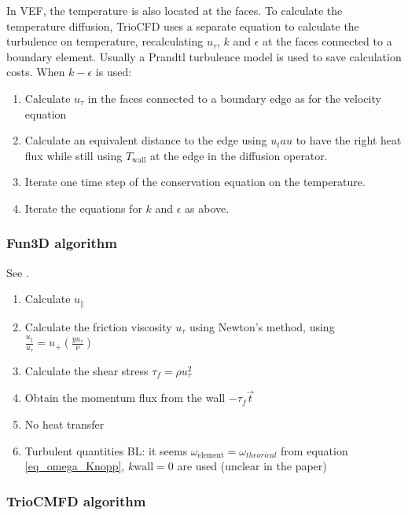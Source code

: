 In VEF, the temperature is also located at the faces. To calculate the temperature diffusion, TrioCFD uses a separate equation to calculate the turbulence on temperature, recalculating $u_\tau$, $k$ and $\epsilon$ at the faces connected to a boundary element. Usually a Prandtl turbulence model is used to save calculation costs. When $k-\epsilon$ is used:
\begin{enumerate}
	\item Calculate $u_\tau$ in the faces connected to a boundary edge as for the velocity equation
	\item Calculate an equivalent distance to the edge using $u_tau$ to have the right heat flux while still using $T_{\text{wall}}$ at the edge in the diffusion operator.
	\item Iterate one time step of the conservation equation on the temperature.
	\item Iterate the equations for $k$ and $\epsilon$ as above.
\end{enumerate} 

\subsubsection{Fun3D algorithm}

See \cite{Fun3D2015}.

\begin{enumerate}
	\item Calculate $u_\parallel$
	\item Calculate the friction viscosity $u_\tau$ using Newton's method, using $\frac{u_\parallel}{u_\tau} = u_+(\frac{y u_\tau}{\nu})$
	\item Calculate the shear stress $\tau_f = \rho u_\tau^2$
	\item Obtain the momentum flux from the wall $-\tau_f \overrightarrow{t}$
	\item No heat transfer
	\item Turbulent quantities BL: it seems $\omega_{\text{element}} = \omega_{theorical}$ from equation \eqref{eq_omega_Knopp}, $k{\text{wall}} = 0$ are used (unclear in the paper)
\end{enumerate}

\subsubsection{TrioCMFD algorithm}

